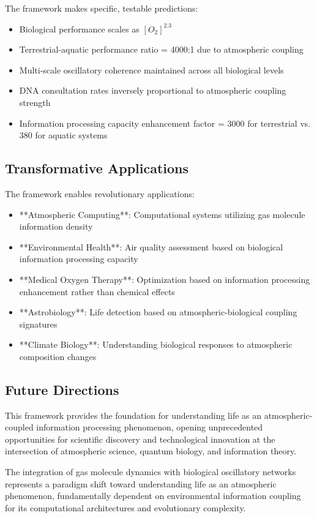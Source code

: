 \documentclass[twocolumn]{article}
\begin{document}
{The framework makes specific, testable predictions:
\begin{itemize}
\item Biological performance scales as $[O_2]^{2.3}$
\item Terrestrial-aquatic performance ratio = 4000:1 due to atmospheric coupling
\item Multi-scale oscillatory coherence maintained across all biological levels
\item DNA consultation rates inversely proportional to atmospheric coupling strength
\item Information processing capacity enhancement factor = 3000 for terrestrial vs. 380 for aquatic systems
\end{itemize}

\subsection{Transformative Applications}

The framework enables revolutionary applications:
\begin{itemize}
\item **Atmospheric Computing**: Computational systems utilizing gas molecule information density
\item **Environmental Health**: Air quality assessment based on biological information processing capacity  
\item **Medical Oxygen Therapy**: Optimization based on information processing enhancement rather than chemical effects
\item **Astrobiology**: Life detection based on atmospheric-biological coupling signatures
\item **Climate Biology**: Understanding biological responses to atmospheric composition changes
\end{itemize}

\subsection{Future Directions}

This framework provides the foundation for understanding life as an atmospheric-coupled information processing phenomenon, opening unprecedented opportunities for scientific discovery and technological innovation at the intersection of atmospheric science, quantum biology, and information theory.

The integration of gas molecule dynamics with biological oscillatory networks represents a paradigm shift toward understanding life as an atmospheric phenomenon, fundamentally dependent on environmental information coupling for its computational architectures and evolutionary complexity.

}
\end{document}
